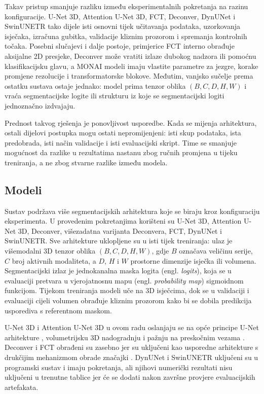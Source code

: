 \documentclass[a4paper,12pt,oneside]{article}
\begin{document}
Takav pristup smanjuje razliku između eksperimentalnih pokretanja na razinu konfiguracije. U-Net 3D, Attention U-Net 3D, FCT, Deconver, DynUNet i SwinUNETR tako dijele isti osnovni tijek učitavanja podataka, uzorkovanja isječaka, izračuna gubitka, validacije kliznim prozorom i spremanja kontrolnih točaka. Posebni slučajevi i dalje postoje, primjerice FCT interno obrađuje aksijalne 2D presjeke, Deconver može vratiti izlaze dubokog nadzora ili pomoćnu klasifikacijsku glavu, a MONAI modeli imaju vlastite parametre za jezgre, korake promjene rezolucije i transformatorske blokove. Međutim, vanjsko sučelje prema ostatku sustava ostaje jednako: model prima tenzor oblika $(B, C, D, H, W)$ i vraća segmentacijske logite ili strukturu iz koje se segmentacijski logiti jednoznačno izdvajaju.

Prednost takvog rješenja je ponovljivost usporedbe. Kada se mijenja arhitektura, ostali dijelovi postupka mogu ostati nepromijenjeni: isti skup podataka, ista predobrada, isti način validacije i isti evaluacijski skript. Time se smanjuje mogućnost da razlike u rezultatima nastanu zbog ručnih promjena u tijeku treniranja, a ne zbog stvarne razlike između modela.

\subsection{Modeli}

Sustav podržava više segmentacijskih arhitektura koje se biraju kroz konfiguraciju eksperimenta. U provedenim pokretanjima korišteni su U-Net 3D, Attention U-Net 3D, Deconver, višezadatna varijanta Deconvera, FCT, DynUNet i SwinUNETR. Sve arhitekture uklopljene su u isti tijek treniranja: ulaz je višemodalni 3D tenzor oblika $(B, C, D, H, W)$, gdje $B$ označava veličinu serije, $C$ broj aktivnih modaliteta, a $D$, $H$ i $W$ prostorne dimenzije isječka ili volumena. Segmentacijski izlaz je jednokanalna maska logita (engl. \textit{logits}), koja se u evaluaciji pretvara u vjerojatnosnu mapu (engl. \textit{probability map}) sigmoidnom funkcijom. Tijekom treniranja modeli uče na 3D isječcima, dok se u validaciji i evaluaciji cijeli volumen obrađuje kliznim prozorom kako bi se dobila predikcija usporediva s referentnom maskom.

U-Net 3D i Attention U-Net 3D u ovom radu oslanjaju se na opće principe U-Net arhitekture \cite{unet}, volumetrijsku 3D nadogradnju \cite{unet3d} i pažnju na preskočnim vezama \cite{attention_unet}. Deconver i FCT obrađeni su zasebno jer su uključeni kao usporedne arhitekture s drukčijim mehanizmom obrade značajki \cite{deconver,fct}. DynUNet i SwinUNETR uključeni su u programski sustav i imaju pokretanja, ali njihovi numerički rezultati nisu uključeni u trenutne tablice jer će se dodati nakon završne provjere evaluacijskih artefakata.
\end{document}
